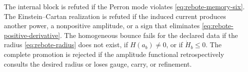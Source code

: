 \begin{falsifierbox}
The internal block is refuted if the Perron mode violates \cref{eq:rebote-memory-six}. The Einstein--Cartan realization is refuted if the induced current produces another power, a nonpositive amplitude, or a sign that eliminates \cref{eq:rebote-positive-derivative}. The homogeneous bounce fails for the declared data if the radius \cref{eq:rebote-radius} does not exist, if \(H(a_b)\ne0\), or if \(\dot H_b\le0\). The complete promotion is rejected if the amplitude functional retrospectively consults the desired radius or loses gauge, carry, or refinement.
\end{falsifierbox}

